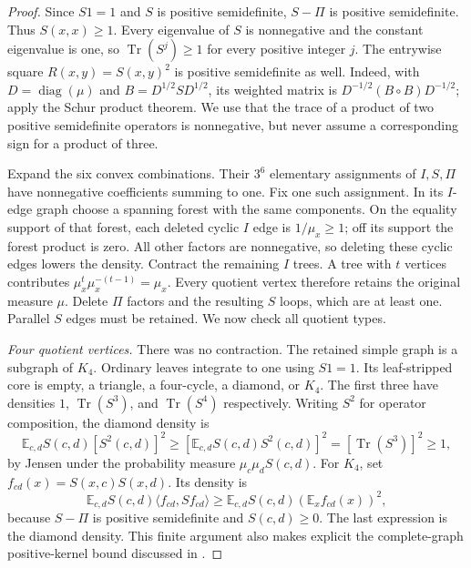 \documentclass[a4paper,11pt,reqno]{amsart}
\theoremstyle{plain}
\theoremstyle{definition}
\theoremstyle{remark}
\begin{document}
\begin{proof}
Since $S1=1$ and $S$ is positive semidefinite, $S-\Pi$ is positive
semidefinite.  Thus $S(x,x)\ge1$.  Every eigenvalue of $S$ is
nonnegative and the constant eigenvalue is one, so
$\operatorname{Tr}(S^j)\ge1$ for every positive integer $j$.
The entrywise square $R(x,y)=S(x,y)^2$ is positive semidefinite as well.
Indeed, with $D=\operatorname{diag}(\mu)$ and $B=D^{1/2}SD^{1/2}$,
its weighted matrix is $D^{-1/2}(B\circ B)D^{-1/2}$; apply the Schur
product theorem.  We use that the trace of a product of two positive
semidefinite operators is nonnegative, but never assume a corresponding
sign for a product of three.

Expand the six convex combinations.  Their $3^6$ elementary assignments
of $I,S,\Pi$ have nonnegative coefficients summing to one.
Fix one such assignment.  In its $I$-edge graph choose a spanning forest
with the same components.  On the equality support of that forest, each
deleted cyclic $I$ edge is $1/\mu_x\ge1$; off its support the forest
product is zero.  All other factors are nonnegative, so deleting these
cyclic edges lowers the density.  Contract the remaining $I$ trees.
A tree with $t$ vertices contributes $\mu_x^t\mu_x^{-(t-1)}=\mu_x$.
Every quotient vertex therefore retains the original measure $\mu$.
Delete $\Pi$ factors and the resulting $S$ loops, which are at least one.
Parallel $S$ edges must be retained.  We now check all quotient types.

\smallskip\noindent\emph{Four quotient vertices.}
There was no contraction.  The retained simple graph is a subgraph of
$K_4$.  Ordinary leaves integrate to one using $S1=1$.
Its leaf-stripped core is empty, a triangle, a four-cycle, a diamond, or
$K_4$.  The first three have densities $1$, $\operatorname{Tr}(S^3)$,
and $\operatorname{Tr}(S^4)$ respectively.
Writing $S^2$ for operator composition, the diamond density is
\[
 \mathbb E_{c,d}S(c,d)[S^2(c,d)]^2
 \ge[\mathbb E_{c,d}S(c,d)S^2(c,d)]^2
 =[\operatorname{Tr}(S^3)]^2\ge1,
\]
by Jensen under the probability measure
$\mu_c\mu_dS(c,d)$.  For $K_4$, set $f_{cd}(x)=S(x,c)S(x,d)$.
Its density is
\[
 \mathbb E_{c,d}S(c,d)\langle f_{cd},Sf_{cd}\rangle
 \ge\mathbb E_{c,d}S(c,d)(\mathbb E_xf_{cd}(x))^2,
\]
because $S-\Pi$ is positive semidefinite and $S(c,d)\ge0$.
The last expression is the diamond density.
This finite argument also makes explicit the complete-graph
positive-kernel bound discussed in \citet{sidorenko2021}.


\end{proof}
\end{document}
